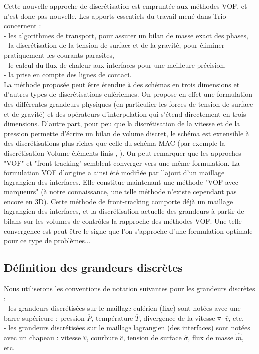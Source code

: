 Cette nouvelle approche de discr\'etisation est emprunt\'ee aux m\'ethodes VOF, et
n'est donc pas nouvelle. Les apports essentiels du travail men\'e dans Trio concernent :\\
- les algorithmes de transport, pour assurer un bilan de masse exact des
phases,\\
- la discr\'etisation de la tension de surface et de la gravit\'e, pour \'eliminer pratiquement les courants parasites,\\
- le calcul du flux de chaleur aux interfaces pour une meilleure pr\'ecision,\\
- la prise en compte des lignes de contact.\\
La m\'ethode propos\'ee peut \^etre \'etendue \`a des sch\'emas en trois dimensions et d'autres types de discr\'etisations eul\'eriennes. On propose en effet une formulation des diff\'erentes grandeurs physiques (en particulier les forces de tension de surface et de gravit\'e) et des op\'erateurs d'interpolation qui s'\'etend directement en trois dimensions. D'autre part, pour peu que la discr\'etisation de la vitesse et de la pression permette d'\'ecrire un bilan de volume discret, le sch\'ema est extensible à des discr\'etisations plus riches que celle du sch\'ema MAC (par exemple la discr\'etisation Volume-\'el\'ements finis \cite{Emonot2003}, \cite{Heib2003}).
On peut remarquer que les approches "VOF" et "front-tracking" semblent converger vers une m\^eme formulation. La formulation VOF d'origine a ainsi \'et\'e modifi\'ee \cite{Popinet2000} par l'ajout d'un maillage lagrangien des
interfaces. Elle constitue maintenant une m\'ethode "VOF avec marqueurs" (\`a notre connaissance, une telle m\'ethode n'existe cependant pas encore en 3D). Cette m\'ethode de front-tracking comporte d\'ej\`a un maillage lagrangien des interfaces, et la discr\'etisation actuelle
des grandeurs à partir de bilans sur les volumes de contr\^oles la rapproche des
m\'ethodes VOF. Une telle convergence est peut-\^etre le signe que l'on s'approche
d'une formulation optimale pour ce type de probl\`emes...

\subsection{D\'efinition des grandeurs discr\`etes}
Nous utiliserons les conventions de notation suivantes pour les grandeurs discr\`etes :\\
- les grandeurs discr\'etis\'ees sur le maillage eul\'erien (fixe) sont not\'ees avec une barre sup\'erieure : pression $\overline{P}$, temp\'erature $\overline{T}$, divergence de la vitesse $\overline{\triangledown \cdot \overline{v}}$, etc.\\
- les grandeurs discr\'etis\'ees sur le maillage lagrangien (des interfaces) sont
not\'ees avec un chapeau : vitesse $\hat{v}$, courbure $\hat{c}$, tension de surface $\hat{\sigma}$, flux de masse $\hat{\dot{m}}$, etc.

